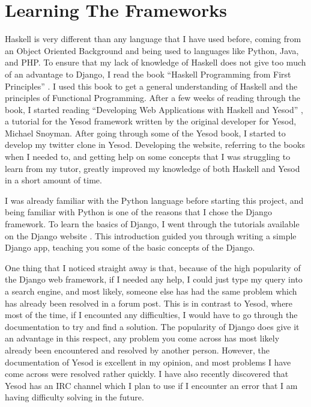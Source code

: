 \section{Learning The Frameworks}

Haskell is very different than any language that I have used before, coming from an Object Oriented Background and being used to languages like Python, Java, and PHP. To ensure that my lack of knowledge of Haskell does not give too much of an advantage to Django, I read the book ``Haskell Programming from First Principles'' \parencite{haskellBook}. I used this book to get a general understanding of Haskell and the principles of Functional Programming. After a few weeks of reading through the book, I started reading ``Developing Web Applications with Haskell and Yesod'' \parencite{yesodBook}, a tutorial for the Yesod framework written by the original developer for Yesod, Michael Snoyman. After going through some of the Yesod book, I started to develop my twitter clone in Yesod. Developing the website, referring to the books when I needed to, and getting help on some concepts that I was struggling to learn from my tutor, greatly improved my knowledge of both Haskell and Yesod in a short amount of time.

I was already familiar with the Python language before starting this project, and being familiar with Python is one of the reasons that I chose the Django framework. To learn the basics of Django, I went through the tutorials available on the Django website \parencite{djangoIntroDocs}. This introduction guided you through writing a simple Django app, teaching you some of the basic concepts of the Django.

One thing that I noticed straight away is that, because of the high popularity of the Django web framework, if I needed any help, I could just type my query into a search engine, and most likely, someone else has had the same problem which has already been resolved in a forum post. This is in contrast to Yesod, where most of the time, if I encounted any difficulties, I would have to go through the documentation to try and find a solution. The popularity of Django does give it an advantage in this respect, any problem you come across has most likely already been encountered and resolved by another person. However, the documentation of Yesod is excellent in my opinion, and most problems I have come across were resolved rather quickly. I have also recently discovered that Yesod has an IRC channel which I plan to use if I encounter an error that I am having difficulty solving in the future.
